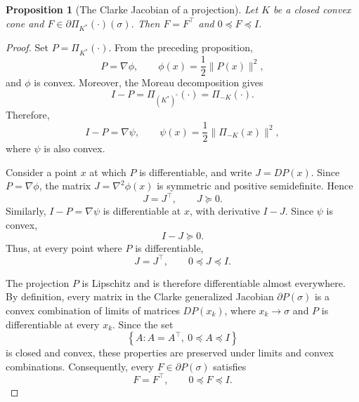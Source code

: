 \documentclass[a4paper,11pt]{book}
\theoremstyle{plain}
\newtheorem{proposition}[theorem]{Proposition}
\theoremstyle{definition}
\theoremstyle{remark}
\numberwithin{equation}{chapter}
\numberwithin{algorithm}{chapter}
\newcommand{\proj}[2]{\Pi_{#2}\!\left(#1\right)}
\begin{document}
	\begin{proposition}[The Clarke Jacobian of a projection]
		Let $K$ be a closed convex cone and $F\in\partial\proj{\cdot}{K^*}(\sigma)$.
		Then $F=F^\top$ and $0\preceq F\preceq I$.
	\end{proposition}
	\begin{proof}
		Set $P=\proj{\cdot}{K^*}$. From the preceding proposition,
		\[
		P=\nabla\phi,
		\qquad
		\phi(x)=\frac12\|P(x)\|^2,
		\]
		and $\phi$ is convex. Moreover, the Moreau decomposition gives
		\[
		I-P=\proj{\cdot}{(K^*)^\circ}=\proj{\cdot}{-K}.
		\]
		Therefore,
		\[
		I-P=\nabla\psi,
		\qquad
		\psi(x)=\frac12\|\proj{x}{-K}\|^2,
		\]
		where $\psi$ is also convex.
		
		Consider a point $x$ at which $P$ is differentiable, and write
		$J=DP(x)$. Since $P=\nabla\phi$, the matrix $J=\nabla^2\phi(x)$ is symmetric
		and positive semidefinite. Hence
		\[
		J=J^\top,
		\qquad
		J\succeq0.
		\]
		Similarly, $I-P=\nabla\psi$ is differentiable at $x$, with derivative $I-J$.
		Since $\psi$ is convex,
		\[
		I-J\succeq0.
		\]
		Thus, at every point where $P$ is differentiable,
		\[
		J=J^\top,
		\qquad
		0\preceq J\preceq I.
		\]
		
		The projection $P$ is Lipschitz and is therefore differentiable almost
		everywhere. By definition, every matrix in the Clarke generalized Jacobian
		$\partial P(\sigma)$ is a convex combination of limits of matrices
		$DP(x_k)$, where $x_k\to\sigma$ and $P$ is differentiable at every $x_k$.
		Since the set
		\[
		\left\{A:A=A^\top,\ 0\preceq A\preceq I\right\}
		\]
		is closed and convex, these properties are preserved under limits and convex
		combinations. Consequently, every $F\in\partial P(\sigma)$ satisfies
		\[
		F=F^\top,
		\qquad
		0\preceq F\preceq I.
		\]
	\end{proof}
	
	
	
\end{document}
